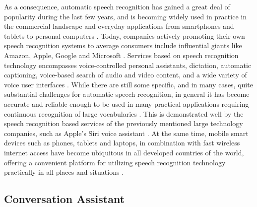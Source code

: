 \documentclass[english, 12pt, a4paper, pdftex, elec, utf8]{aaltothesis}
\begin{document}
As a consequence, automatic speech recognition has gained a great deal of popularity during the last few years, and is becoming widely used in practice in the commercial landscape and everyday applications from smartphones and tablets to personal computers \cite{yu2014automatic}. Today, companies actively promoting their own speech recognition systems to average consumers include influential giants like Amazon, Apple, Google and Microsoft \cite{xiong2017microsoft}. Services based on speech recognition technology encompasses voice-controlled personal assistants, dictation, automatic captioning, voice-based search of audio and video content, and a wide variety of voice user interfaces \cite{yu2014automatic, li2014overview}. While there are still some specific, and in many cases, quite substantial challenges for automatic speech recognition, in general it has become accurate and reliable enough to be used in many practical applications requiring continuous recognition of large vocabularies \cite{yu2014automatic, keronen2014approaching, mcgraw2016personalized}. This is demonstrated well by the speech recognition based services of the previously mentioned large technology companies, such as Apple's Siri voice assistant \cite{li2014overview}. At the same time, mobile smart devices such as phones, tablets and laptops, in combination with fast wireless internet access have become ubiquitous in all developed countries of the world, offering a convenient platform for utilizing speech recognition technology practically in all places and situations \cite{yu2014automatic, mcgraw2016personalized}.

\subsection{Conversation Assistant}
\end{document}
